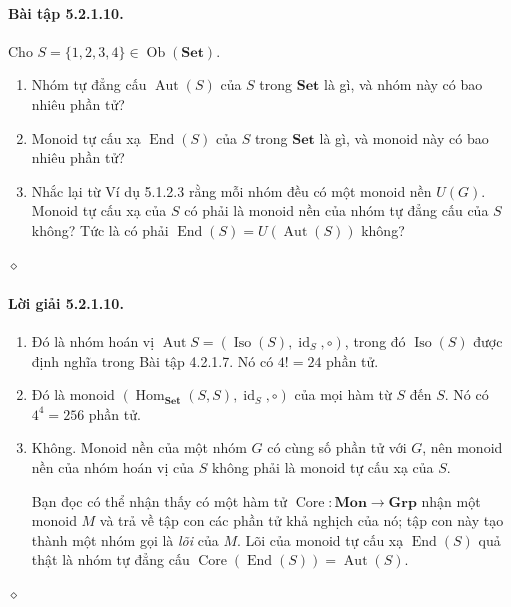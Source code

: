 \paragraph{Bài tập 5.2.1.10.} Cho $S=\{1,2,3,4\}\in\operatorname{Ob}(\mathbf{Set})$.
\begin{enumerate}[label=\alph*.]
\item Nhóm tự đẳng cấu $\operatorname{Aut}(S)$ của $S$ trong $\mathbf{Set}$ là gì, và nhóm này có bao nhiêu phần tử?
\item Monoid tự cấu xạ $\operatorname{End}(S)$ của $S$ trong $\mathbf{Set}$ là gì, và monoid này có bao nhiêu phần tử?
\item Nhắc lại từ Ví dụ 5.1.2.3 rằng mỗi nhóm đều có một monoid nền $U(G)$. Monoid tự cấu xạ của $S$ có phải là monoid nền của nhóm tự đẳng cấu của $S$ không? Tức là có phải $\operatorname{End}(S)=U(\operatorname{Aut}(S))$ không?
\end{enumerate}\hfill$\diamond$
\paragraph{Lời giải 5.2.1.10.}
\begin{enumerate}[label=\alph*.]
\item Đó là nhóm hoán vị $\operatorname{Aut}S=(\operatorname{Iso}(S),\operatorname{id}_S,\circ)$, trong đó $\operatorname{Iso}(S)$ được định nghĩa trong Bài tập 4.2.1.7. Nó có $4!=24$ phần tử.
\item Đó là monoid $(\operatorname{Hom}_{\mathbf{Set}}(S,S),\operatorname{id}_S,\circ)$ của mọi hàm từ $S$ đến $S$. Nó có $4^4=256$ phần tử.
\item Không. Monoid nền của một nhóm $G$ có cùng số phần tử với $G$, nên monoid nền của nhóm hoán vị của $S$ không phải là monoid tự cấu xạ của $S$.

Bạn đọc có thể nhận thấy có một hàm tử $\operatorname{Core}:\mathbf{Mon}\to\mathbf{Grp}$ nhận một monoid $M$ và trả về tập con các phần tử khả nghịch của nó; tập con này tạo thành một nhóm gọi là \emph{lõi} của $M$. Lõi của monoid tự cấu xạ $\operatorname{End}(S)$ quả thật là nhóm tự đẳng cấu $\operatorname{Core}(\operatorname{End}(S))=\operatorname{Aut}(S)$.
\end{enumerate}\hfill$\diamond$
